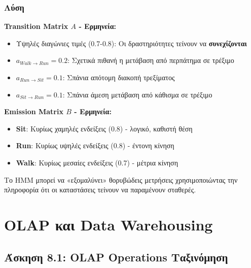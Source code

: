 \subsubsection*{Λύση}

\textbf{Transition Matrix $A$ - Ερμηνεία:}

\begin{itemize}
    \item Υψηλές διαγώνιες τιμές (0.7-0.8): Οι δραστηριότητες τείνουν να \textbf{συνεχίζονται}
    \item $a_{Walk \to Run} = 0.2$: Σχετικά πιθανή η μετάβαση από περπάτημα σε τρέξιμο
    \item $a_{Run \to Sit} = 0.1$: Σπάνια απότομη διακοπή τρεξίματος
    \item $a_{Sit \to Run} = 0.1$: Σπάνια άμεση μετάβαση από κάθισμα σε τρέξιμο
\end{itemize}

\textbf{Emission Matrix $B$ - Ερμηνεία:}

\begin{itemize}
    \item \textbf{Sit}: Κυρίως χαμηλές ενδείξεις (0.8) - λογικό, καθιστή θέση
    \item \textbf{Run}: Κυρίως υψηλές ενδείξεις (0.8) - έντονη κίνηση
    \item \textbf{Walk}: Κυρίως μεσαίες ενδείξεις (0.7) - μέτρια κίνηση
\end{itemize}

\begin{infobox}
Το HMM μπορεί να «εξομαλύνει» θορυβώδεις μετρήσεις χρησιμοποιώντας την πληροφορία
ότι οι καταστάσεις τείνουν να παραμένουν σταθερές.
\end{infobox}


\section{OLAP και Data Warehousing}

\subsection{Άσκηση 8.1: OLAP Operations Ταξινόμηση}

